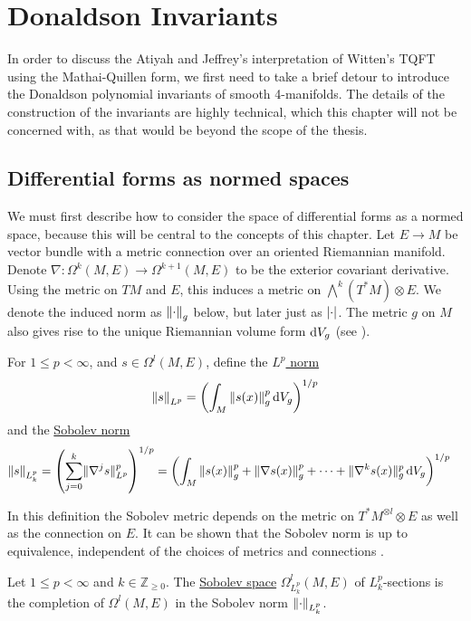 
\chapter{Donaldson Invariants}
\label{chapter1}
In order to discuss the Atiyah and Jeffrey's interpretation of Witten's TQFT
using the Mathai-Quillen form, we first need to take a brief detour to introduce
the Donaldson polynomial invariants of smooth 4-manifolds. 
The details of the construction of the invariants are highly technical, which
this chapter will not be concerned with, as that would be beyond the scope of 
the thesis. 

\section{Differential forms as normed spaces}
We must first describe how to consider the space of differential forms
as a normed space, because this will be central to the concepts of this chapter.
Let $E\to M$ be vector bundle with a metric connection over an oriented 
Riemannian manifold. 
Denote $\nabla : \Omega^k(M,E) \to \Omega^{k+1}(M,E)$ to be the exterior
covariant derivative. Using the metric on $TM$ and  $E$, this induces a
metric on  $\bigwedge^k(T^*M)\otimes E$. We denote the induced norm as 
$\norm{\cdot}_g$ below, but later just as $\abs{\cdot}$.
The metric $g$ on $M$ also gives rise to the unique Riemannian volume form 
$\odif{V}_g$ (see \cite[Prop 2.41]{riemannian_manifolds}).
\begin{defn}
    For $1 \leq p < \infty$, and $s \in \Omega^l(M,E)$, 
	define the \underline{$L^p$ norm}
	\[
		 \norm{s}_{L^p} = \paren{\int_M \norm{s(x)}^p_g \odif{V}_g}^{1 /p}
	\] 
	and the \underline{Sobolev norm}
	\begin{align*}
		\norm{s}_{L^p_k} 
		&= \paren{\sum_{j=0}^{k} \norm[*]{\nabla^j s}_{L^p}^p }^{1 /p} 
		= \paren{ \int_M \norm{s(x)}^p_g + \norm{\nabla s(x)}^p_g + \cdots
		+ \norm[*]{\nabla^k s(x)}^p_g \odif{V}_g}^{1 /p} 
	\end{align*}
\end{defn}
In this definition the Sobolev metric depends on the metric on $T^*M^{\otimes
l}\otimes E$ as well as the connection on $E$. It can be shown that the Sobolev
norm is up to equivalence, independent of the choices of metrics and connections
\cite[Lemma 11.22]{math_for_physics}.
\begin{defn}
	Let $1\leq p < \infty$ and  $k\in \mathbb{Z}_{\geq 0}$. The
	\underline{Sobolev
	space} $\Omega^l_{L^p_k}(M,E)$ of $L^p_k$-sections is the completion of
	$\Omega^l(M,E)$ in the Sobolev norm  $\norm{\cdot}_{L^p_k}$.
\end{defn}

